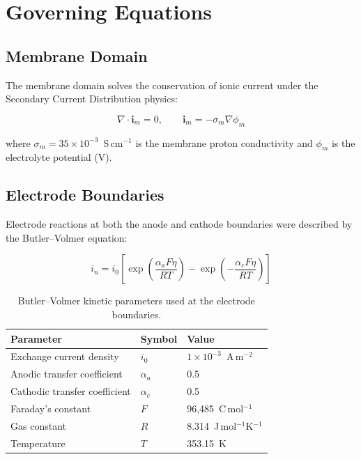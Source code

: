 \documentclass[12pt,a4paper]{report}
\begin{document}
\section{Governing Equations}

\subsection{Membrane Domain}

The membrane domain solves the conservation of ionic current 
under the Secondary Current Distribution physics:

\begin{equation}
\nabla \cdot \mathbf{i}_m = 0, \qquad 
\mathbf{i}_m = -\sigma_m \nabla \phi_m
\end{equation}

where \(\sigma_m = 35 \times 10^{-3}\)~S\,cm\(^{-1}\) 
is the membrane proton conductivity and \(\phi_m\) is the 
electrolyte potential (V).

\subsection{Electrode Boundaries}

Electrode reactions at both the anode and cathode boundaries 
were described by the Butler--Volmer equation:

\begin{equation}
i_n = i_0 \left[
\exp\!\left(\frac{\alpha_a F \eta}{RT}\right) -
\exp\!\left(-\frac{\alpha_c F \eta}{RT}\right)
\right]
\end{equation}

\begin{table}[h]
\centering
\caption{Butler--Volmer kinetic parameters used at the 
electrode boundaries.}
\label{tab:bv-params}
\begin{tabular}{lll}
\toprule
Parameter & Symbol & Value \\
\midrule
Exchange current density & $i_0$ & $1 \times 10^{-3}$~A\,m\(^{-2}\) \\
Anodic transfer coefficient & $\alpha_a$ & 0.5 \\
Cathodic transfer coefficient & $\alpha_c$ & 0.5 \\
Faraday's constant & $F$ & 96{,}485~C\,mol\(^{-1}\) \\
Gas constant & $R$ & 8.314~J\,mol\(^{-1}\)K\(^{-1}\) \\
Temperature & $T$ & 353.15~K \\
\bottomrule
\end{tabular}
\end{table}
\end{document}
